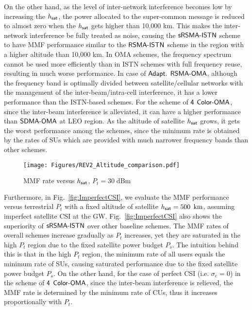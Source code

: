 \documentclass[draftclsnofoot, onecolumn, comsoc, 12pt]{IEEEtran}
\begin{document}
{{{%
}}
%
On the other hand, as the level of inter-network interference becomes low by increasing the $h_{\sf sat}$, the power allocated to the super-common message is reduced to almost zero when the $h_{\sf sat}$ gets higher than 10,000 km. 
This makes the inter-network interference be fully treated as noise, causing the  $\sf{sRSMA\mbox{-}ISTN}$ scheme to have MMF performance similar to the ${\sf RSMA\mbox{-}ISTN}$ scheme in the region with a higher altitude than 10,000 km.
%
In OMA schemes, the frequency spectrum cannot be used more efficiently than in ISTN schemes with full frequency reuse, resulting in much worse performance.} 
In case of $\sf{Adapt.}$ $\sf{RSMA\mbox{-}OMA}$, although the frequency band is optimally divided between satellite/cellular networks with the management of the inter-beam/intra-cell interference, it has a lower performance than the ISTN-based schemes. 
For the scheme of $\sf{4}$ $\sf{Color\mbox{-}OMA}$, since the inter-beam interference is alleviated, it can have a higher performance than $\sf{SDMA\mbox{-}OMA}$ at LEO region. 
As the altitude of satellite $h_{\sf{sat}}$ grows, it gets the worst performance among the schemes, since the minimum rate is obtained by the rates of SUs which are provided with much narrower frequency bands than other schemes. 
%
\begin{figure}[!t]
    \centering
  \vspace{-80mm}   
  \texttt{[image: Figures/REV2\_Altitude\_comparison.pdf]}
 \vspace{-80mm}
    \caption{{MMF rate versus $h_{\sf{sat}}$, $P_{t} = 30\;\mathrm{dBm}$}}
    \label{fig:Altitude}
\end{figure}
Furthermore, in Fig.~\ref{fig:ImperfectCSI}, we evaluate the MMF performance versus terrestrial $P_{t}$ with a fixed altitude of satellite $h_{\sf sat} = 500$ $\rm{km}$, assuming imperfect satellite CSI at the GW.
Fig.~\mbox{\ref{fig:ImperfectCSI}} also shows the superiority of $\sf{sRSMA\mbox{-}ISTN}$ over other baseline schemes.
The MMF rates of overall schemes increase gradually as $P_{t}$ increases, yet they are saturated in the high $P_{t}$ region due to the fixed satellite power budget $P_{s}$. 
The intuition behind this is that in the high $P_{t}$ region, the minimum rate of all users equals the minimum rate of SUs, causing saturated performance due to the fixed satellite power budget $P_{s}$. On the other hand, for the case of perfect CSI (i.e. $\sigma_e=0$) in the scheme of $\sf{4}$ $\sf{Color\mbox{-}OMA}$, since the inter-beam interference is relieved, the MMF rate is determined by the minimum rate of CUs, thus it increases proportionally with $P_{t}$. 
\end{document}
